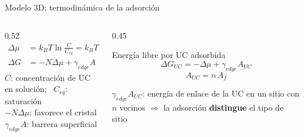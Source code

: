 \documentclass[aspectratio=169,11pt]{beamer}
\newcommand{\kB}{k_{B}}
\begin{document}
\begin{frame}{Modelo 3D: termodinámica de la adsorción}
  \begin{columns}[c,onlytextwidth]
    \begin{column}{0.52\textwidth}
      \begin{align}
        \Delta\mu &= \kB T\ln\frac{C}{C_{eq}} = \kB T\ln(\sigma+1) \tag{16}\\[0.4em]
        \Delta G  &= -N\Delta\mu + \gamma_{edge}A \tag{17}
      \end{align}
      \vspace{0.2em}
      {\footnotesize $C$: concentración de UC en solución; \ $C_{eq}$: saturación}\\[0.3em]
      {\footnotesize $-N\Delta\mu$: favorece el cristal \quad $\gamma_{edge}A$: barrera superficial}
    \end{column}
    \begin{column}{0.45\textwidth}
      \begin{block}{Energía libre por UC adsorbida}
        \begin{equation}
          \Delta G_{UC} = -\Delta\mu + \gamma_{edge}A_{UC} \tag{18}
        \end{equation}
        \[
          A_{UC} = n\,A_f
        \]
      \end{block}
      \vspace{0.4em}
      {\small $\gamma_{edge}A_{UC}$: energía de enlace de la UC en un sitio con $n$ vecinos
       $\Rightarrow$ la adsorción \textbf{distingue} el tipo de sitio}
    \end{column}
  \end{columns}
\end{frame}
\end{document}
